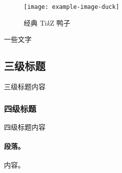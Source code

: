 \documentclass[fontset = mac ms]{seuthesis2024b}
\begin{document}
      \begin{figure}[htbp]
        \centering
        \texttt{[image: example-image-duck]}
        \caption{经典 Ti\textit{k}Z 鸭子}
      \end{figure}

      一些文字

      \subsection{三级标题}
        三级标题内容
        \subsubsection{四级标题}
        四级标题内容
        \paragraph{段落。}内容。

      
    
    
\end{document}
